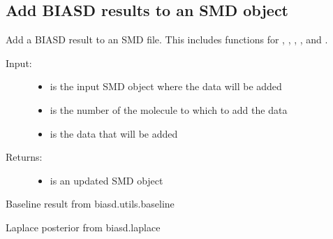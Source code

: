 \documentclass[letterpaper,10pt,english]{sphinxmanual}
\begin{document}
\subsection{Add BIASD results to an SMD object}
\label{code_smd:module-smd.add}\label{code_smd:add-biasd-results-to-an-smd-object}
Add a BIASD result to an SMD file. This includes functions for , , , , and .
\begin{description}
\item[{Input:}] \leavevmode\begin{itemize}
\item {} 
 is the input SMD object where the data will be added

\item {} 
 is the number of the molecule to which to add the data

\item {} 
 is the data that will be added

\end{itemize}

\item[{Returns:}] \leavevmode\begin{itemize}
\item {} 
 is an updated SMD object

\end{itemize}

\end{description}

\begin{fulllineitems}
\label{code_smd:smd.add.baseline}
Baseline result from biasd.utils.baseline

\end{fulllineitems}


\begin{fulllineitems}
\label{code_smd:smd.add.laplace_posterior}
Laplace posterior from biasd.laplace

\end{fulllineitems}
\end{document}
